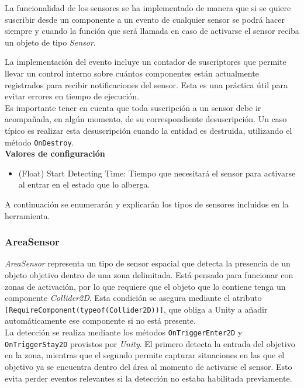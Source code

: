 La funcionalidad de los sensores se ha implementado de manera que si se quiere suscribir desde un componente a un evento de cualquier sensor se podrá hacer siempre y cuando la función que será llamada en caso de activarse el sensor reciba un objeto de tipo \textit{Sensor}.\\


La implementación del evento incluye un contador de suscriptores que permite llevar un control interno sobre cuántos componentes están actualmente registrados para recibir notificaciones del sensor. Esta es una práctica útil para evitar errores en tiempo de ejecución.\\

Es importante tener en cuenta que toda suscripción a un sensor debe ir acompañada, en algún momento, de su correspondiente desuscripción. Un caso típico es realizar esta desuscripción cuando la entidad es destruida, utilizando el método \texttt{OnDestroy}.\\

\textbf{Valores de configuración}
\begin{itemize}
	\item (Float) Start Detecting Time: Tiempo que necesitará el sensor para activarse al entrar en el estado que lo alberga.
\end{itemize}


A continuación se enumerarán y explicarán los tipos de sensores incluidos en la herramienta.\\
\subsubsection{AreaSensor}

\textit{AreaSensor} representa un tipo de sensor espacial que detecta la presencia de un objeto objetivo dentro de una zona delimitada. Está pensado para funcionar con zonas de activación, por lo que requiere que el objeto que lo contiene tenga un componente \textit{Collider2D}. Esta condición se asegura mediante el atributo \texttt{[RequireComponent(typeof(Collider2D))]}, que obliga a Unity a añadir automáticamente ese componente si no está presente.\\

La detección se realiza mediante los métodos \texttt{OnTriggerEnter2D} y \texttt{OnTriggerStay2D} provistos por \textit{Unity}. El primero detecta la entrada del objetivo en la zona, mientras que el segundo permite capturar situaciones en las que el objetivo ya se encuentra dentro del área al momento de activarse el sensor. Esto evita perder eventos relevantes si la detección no estaba habilitada previamente.\\


